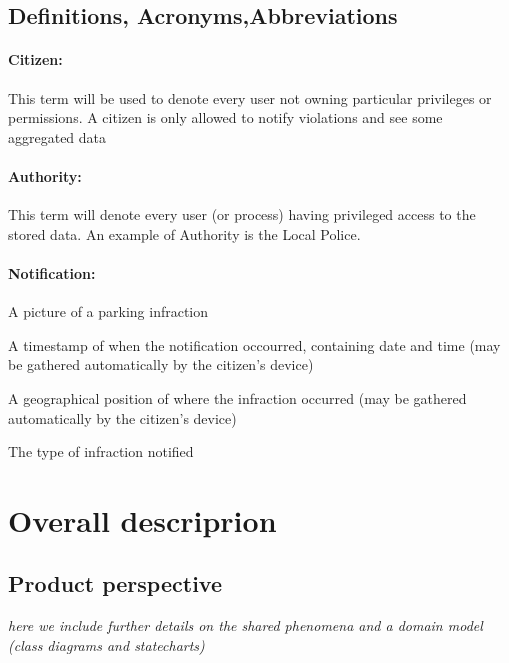 \documentclass{article}
\begin{document}
	\subsection{Definitions, Acronyms,Abbreviations}
		\paragraph{Citizen:} This term will be used to denote every user not owning particular privileges or permissions. A citizen is only allowed to notify violations and see some aggregated data
		\paragraph{Authority:} This term will denote every user (or process) having privileged access to the stored data. An example of Authority is the Local Police.
		\paragraph{Notification:} 
			\begin{list}{-}{Represents a set of data submitted by any user composed by:}
				\item A picture of a parking infraction
				\item A timestamp of when the notification occourred, containing date and time (may be gathered automatically by the citizen's device)
				\item A geographical position of where the infraction occurred (may be gathered automatically by the citizen's device)
				\item The type of infraction notified
			\end{list}
\section{Overall descriprion}
	\subsection{Product perspective} \textit{here we include further details on the shared phenomena and a domain model (class diagrams and statecharts)}
\end{document}
